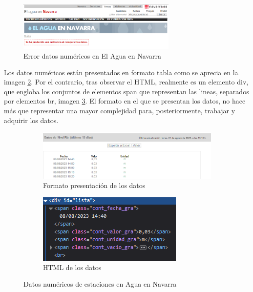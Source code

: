\begin{figure} [H]
	\centering
	\includegraphics[width=0.7\textwidth]{fig/ErrorAguaEnNavarra.png}
	\caption[Error al cargar directamente la página de datos numéricos en El Agua en Navarra]{Error datos numéricos en El Agua en Navarra}
	\label{fig:ej5}
\end{figure}

Los datos numéricos están presentados en formato tabla como se aprecia en la imagen \ref{fig:sub3}. Por el contrario, tras observar el HTML, realmente es un elemento div, que engloba los conjuntos de elementos span que representan las lineas, separados por elementos br, imagen \ref{fig:sub4}. El formato en el que se presentan los datos, no hace más que representar una mayor complejidad para, posteriormente, trabajar y adquirir los datos. 

\begin{figure} [H]
	\centering
	\begin{subfigure}{.5\textwidth}
		\centering
		\includegraphics[width=.9\linewidth]{fig/AguaEnNavarraData.png}
		\caption{Formato presentación de los datos}
		\label{fig:sub3}
	\end{subfigure}%
	\begin{subfigure}{.5\textwidth}
		\centering
		\includegraphics[width=.7\linewidth]{fig/AguaEnNavarraDataHTML.png}
		\caption{HTML de los datos}
		\label{fig:sub4}
	\end{subfigure}
	\caption{Datos numéricos de estaciones en Agua en Navarra}
	\label{fig:ej26}
\end{figure}